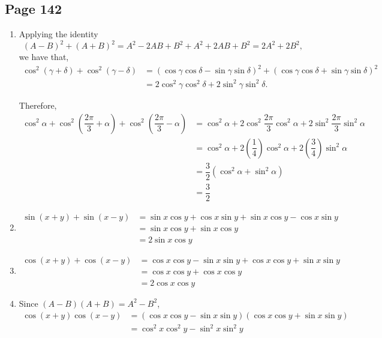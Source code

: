 \documentclass{article}
\newenvironment{solutions}[1]
{\subsection*{#1}
 \begin{enumerate}[leftmargin=1.5em]}
{\end{enumerate}}
\newcommand{\solution}{\item}
\newenvironment{subsolutions}
{\begin{enumerate}}
{\end{enumerate}}
\begin{document}
\begin{solutions}{Page 142}
\begin{subsolutions}
\end{subsolutions}

\solution %
Applying the identity
\[
(A-B)^{2} + (A+B)^{2} = A^2-2AB+B^2 + A^2+2AB+B^2 = 2A^2 + 2B^2,
\]
we have that,
\begin{align*}
    \cos^{2}\left(\gamma+\delta\right) + \cos^{2}\left(\gamma-\delta\right) &= \left(\cos{\gamma}\cos{\delta} - \sin{\gamma}\sin{\delta}\right)^2 + \left(\cos{\gamma}\cos{\delta} + \sin{\gamma}\sin{\delta}\right)^2 \\
    &= 2\cos^{2}{\gamma}\cos^{2}{\delta} + 2\sin^{2}{\gamma}\sin^{2}{\delta}.
\end{align*}

Therefore,
\begin{align*}
\cos^{2}{\alpha} + \cos^{2}\left(\dfrac{2\pi}{3} + \alpha\right) +  \cos^{2}\left(\dfrac{2\pi}{3} - \alpha\right) &= \cos^{2}{\alpha} + 2\cos^{2}{\dfrac{2\pi}{3}}\cos^{2}{\alpha} + 2\sin^{2}{\dfrac{2\pi}{3}}\sin^{2}{\alpha} \\
&= \cos^{2}{\alpha} + 2\left(\dfrac{1}{4}\right)\cos^{2}{\alpha} + 2\left(\dfrac{3}{4}\right)\sin^{2}{\alpha} \\
&= \dfrac{3}{2} \left(\cos^{2}{\alpha} + \sin^{2}{\alpha}\right) \\
&= \dfrac{3}{2}
\end{align*}

\solution %
\begin{align*}
\sin\left(x+y\right) + \sin\left(x-y\right) &= \sin{x}\cos{y} + \cos{x}\sin{y} + \sin{x}\cos{y} - \cos{x}\sin{y} \\
&= \sin{x}\cos{y} + \sin{x}\cos{y} \\
&= 2\sin{x}\cos{y}
\end{align*}

\solution %
\begin{align*}
\cos\left(x+y\right) + \cos\left(x-y\right) &= \cos{x}\cos{y} - \sin{x}\sin{y} + \cos{x}\cos{y} + \sin{x}\sin{y} \\
&= \cos{x}\cos{y} + \cos{x}\cos{y} \\
&= 2\cos{x}\cos{y}
\end{align*}

\solution %
Since $(A-B)(A+B)=A^2-B^2$,
\begin{align*}
\cos\left(x+y\right)\cos\left(x-y\right) &= \left(\cos{x}\cos{y} - \sin{x}\sin{y}\right) \left(\cos{x}\cos{y} + \sin{x}\sin{y}\right) \\
&= \cos^{2}{x}\cos^{2}{y} - \sin^{2}{x}\sin^{2}{y}
\end{align*}


\end{solutions}
\end{document}
